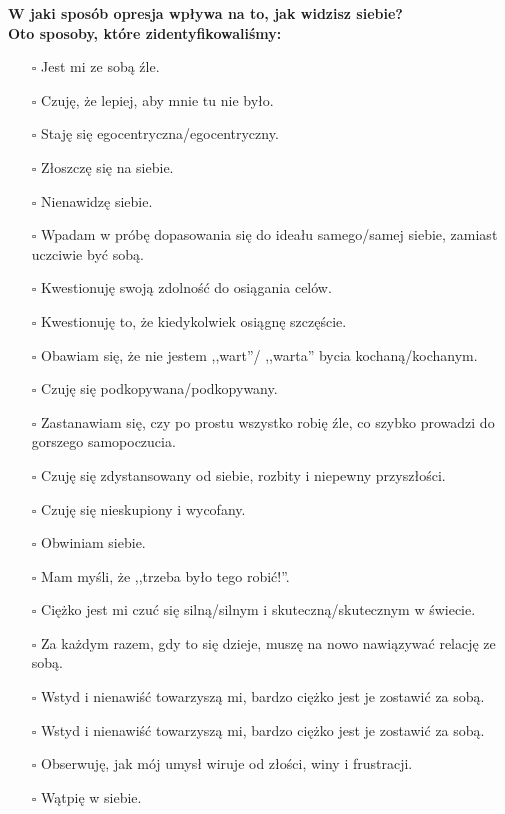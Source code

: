 \noindent\textcolor{ProcessBlue}{\textbf{\Large{W jaki sposób opresja wpływa na to, jak widzisz siebie?}}}\\
\textbf{\large{Oto sposoby, które zidentyfikowaliśmy:}}
\begin{multicols}{2}
\begin{itemize}
\item[$\square$]{Jest mi ze sobą źle.}
\item[$\square$]{Czuję, że lepiej, aby mnie tu nie było.}
\item[$\square$]{Staję się egocentryczna/egocentryczny.}
\item[$\square$]{Złoszczę się na siebie.}
\item[$\square$]{Nienawidzę siebie.}
\item[$\square$]{Wpadam w próbę dopasowania się do ideału samego/samej siebie, zamiast uczciwie być sobą.}
\item[$\square$]{Kwestionuję swoją zdolność do osiągania celów.}
\item[$\square$]{Kwestionuję to, że kiedykolwiek osiągnę szczęście.}
\item[$\square$]{Obawiam się, że nie jestem ,,wart''/ ,,warta'' bycia kochaną/kochanym.}
\item[$\square$]{Czuję się podkopywana/podkopywany.}
\item[$\square$]{Zastanawiam się, czy po prostu wszystko robię źle, co szybko prowadzi do gorszego samopoczucia.}
\item[$\square$]{Czuję się zdystansowany od siebie, rozbity i niepewny przyszłości.}
\item[$\square$]{Czuję się nieskupiony i wycofany.}
\item[$\square$]{Obwiniam siebie.}
\item[$\square$]{Mam myśli, że ,,trzeba było tego robić!”.}
\item[$\square$]{Ciężko jest mi czuć się silną/silnym i skuteczną/skutecznym w świecie.}
\item[$\square$]{Za każdym razem, gdy to się dzieje, muszę na nowo nawiązywać relację ze sobą.}
\item[$\square$]{Wstyd i nienawiść towarzyszą mi, bardzo ciężko jest je zostawić za sobą.}
\item[$\square$]{Wstyd i nienawiść towarzyszą mi, bardzo ciężko jest je zostawić za sobą.}
\item[$\square$]{Obserwuję, jak mój umysł wiruje od złości, winy i frustracji.}
\item[$\square$]{Wątpię w siebie.}

\end{itemize}
\end{multicols}
